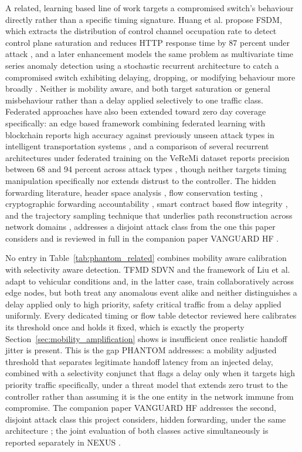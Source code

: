 \documentclass[final,5p,twocolumn]{elsarticle}
\theoremstyle{remark}
\theoremstyle{plain}
\begin{document}
A related, learning based line of work targets a compromised switch's
behaviour directly rather than a specific timing signature. Huang et al.
propose FSDM, which extracts the distribution of control channel
occupation rate to detect control plane saturation and reduces HTTP
response time by 87 percent under attack \cite{Huang2020}, and a later
enhancement models the same problem as multivariate time series anomaly
detection using a stochastic recurrent architecture to catch a
compromised switch exhibiting delaying, dropping, or modifying behaviour
more broadly \cite{Chi2020}. Neither is mobility aware, and both target
saturation or general misbehaviour rather than a delay applied
selectively to one traffic class. Federated approaches have also been
extended toward zero day coverage specifically: an edge based framework
combining federated learning with blockchain reports high accuracy
against previously unseen attack types in intelligent transportation
systems \cite{AbouElHouda2024}, and a comparison of several recurrent
architectures under federated training on the VeReMi dataset reports
precision between 68 and 94 percent across attack types
\cite{Mansouri2024}, though neither targets timing manipulation
specifically nor extends distrust to the controller. The hidden
forwarding literature, header space analysis \cite{Mohammadi2016}, flow
conservation testing \cite{Pang2016FADE}, cryptographic forwarding
accountability \cite{Sasaki2016SDNsec}, smart contract based flow
integrity \cite{Bargayary2023FTISCON}, and the trajectory sampling
technique that underlies path reconstruction across network domains
\cite{Duffield2001}, addresses a disjoint attack class from the one this
paper considers and is reviewed in full in the companion paper VANGUARD HF
\cite{VanguardHF2026}.

No entry in Table~\ref{tab:phantom_related} combines mobility aware
calibration with selectivity aware detection. TFMD SDVN and the framework of
Liu et al. adapt to vehicular conditions and, in the latter case, train
collaboratively across edge nodes, but both treat any anomalous event alike
and neither distinguishes a delay applied only to high priority, safety
critical traffic from a delay applied uniformly. Every dedicated timing or
flow table detector reviewed here calibrates its threshold once and holds it
fixed, which is exactly the property Section~\ref{sec:mobility_amplification}
shows is insufficient once realistic handoff jitter is present. This is the
gap PHANTOM addresses: a mobility adjusted threshold that separates
legitimate handoff latency from an injected delay, combined with a
selectivity conjunct that flags a delay only when it targets high priority
traffic specifically, under a threat model that extends zero trust to the
controller rather than assuming it is the one entity in the network immune
from compromise. The companion paper VANGUARD HF addresses the second,
disjoint attack class this project considers, hidden forwarding, under the
same architecture \cite{VanguardHF2026}; the joint evaluation of both classes
active simultaneously is reported separately in NEXUS \cite{Nexus2026}.
\end{document}
